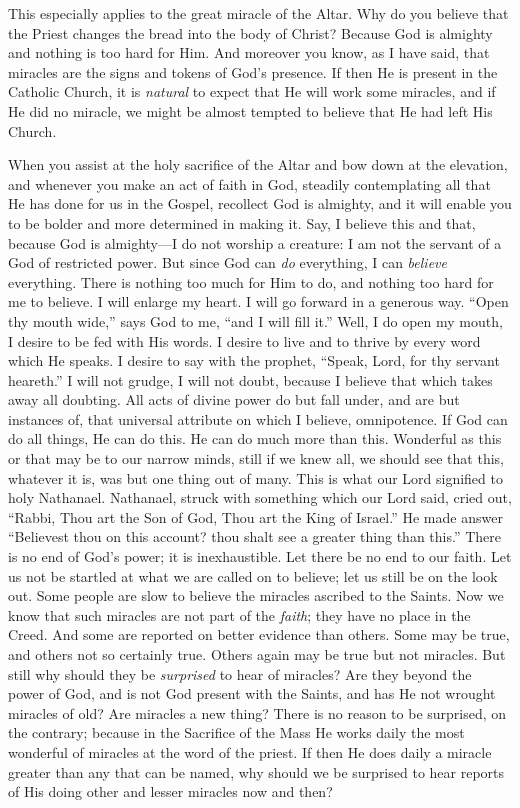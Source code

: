 This especially applies to the great miracle of
the Altar. Why do you believe that the Priest changes the bread into
the body of Christ? Because God is almighty and nothing is too hard
for Him. And moreover you know, as I have said, that miracles are the
signs and tokens of God's presence. If then He is present in the
Catholic Church, it is \emph{natural} to expect that He will work
some miracles, and if He did no miracle, we might be almost tempted to
believe that He had left His Church.

When you assist at the holy sacrifice of the
Altar and bow down at the elevation, and whenever you make an act of
faith in God, steadily contemplating all that He has done for us in
the Gospel, recollect God is almighty, and it will enable you to be
bolder and more determined in making it. Say, I believe this and that,
because God is almighty—I do not worship a creature: I am not the
servant of a God of restricted power. But since God can \emph{do}
everything, I can \emph{believe} everything. There is nothing too much
for Him to do, and nothing too hard for me to believe. I will enlarge
my heart. I will go forward in a generous way. ``Open thy mouth wide,''
says God to me, ``and I will fill it.'' Well, I do open my mouth, I
desire to be fed with His words. I desire to live and to thrive by
every word which He speaks. I desire to say with the prophet, ``Speak,
Lord, for thy servant heareth.'' I will not grudge, I will not doubt,
because I believe that which takes away all doubting. All acts of
divine power do but fall under, and are but instances of, that
universal attribute on which I believe, omnipotence. If God can do all
things, He can do this. He can do much more than this. Wonderful as
this or that may be to our narrow minds, still if we knew all, we
should see that this, whatever it is, was but one thing out of many.
This is what our Lord signified to holy Nathanael. Nathanael,
struck with something which our Lord said, cried out, ``Rabbi, Thou art
the Son of God, Thou art the King of Israel.'' He made answer ``Believest
thou on this account? thou shalt see a greater thing than this.'' There
is no end of God's power; it is inexhaustible. Let there be no end to
our faith. Let us not be startled at what we are called on to believe;
let us still be on the look out. Some people are slow to believe the
miracles ascribed to the Saints. Now we know that such miracles are
not part of the \emph{faith}; they have no place in the Creed. And
some are reported on better evidence than others. Some may be true,
and others not so certainly true. Others again may be true but not
miracles. But still why should they be \emph{surprised} to hear of
miracles? Are they beyond the power of God, and is not God present
with the Saints, and has He not wrought miracles of old? Are miracles
a new thing? There is no reason to be surprised, on the contrary;
because in the Sacrifice of the Mass He works daily the most wonderful
of miracles at the word of the priest. If then He does daily a miracle
greater than any that can be named, why should we be surprised to hear
reports of His doing other and lesser miracles now and then?

